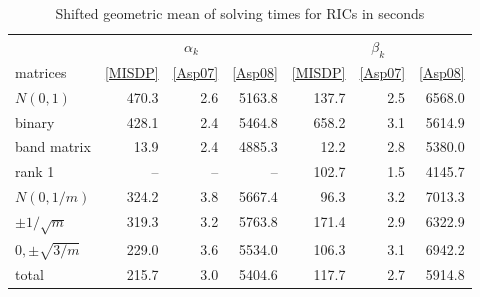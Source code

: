 \begin{table} 
 \begin{scriptsize} \caption{Shifted geometric mean of solving times for RICs in seconds} 
 \label{lhsRhsTime} 
 \begin{tabular*}{\linewidth}{@{}l@{\;\;\extracolsep{\fill}}rrrrrr@{}}\toprule 
  & \multicolumn{3}{c}{$\alpha_k$} & \multicolumn{3}{c}{$\beta_k$} \\ 
\cmidrule(r){2-4} \cmidrule(l){5-7} 
 matrices & \eqref{MISDP} & \eqref{Asp07} & \eqref{Asp08} & \eqref{MISDP} & \eqref{Asp07} & \eqref{Asp08} \\ \midrule 
$N(0,1)$& \num{470.3} & \num{2.6} & \num{5163.8} & \num{137.7} & \num{2.5} & \num{6568.0} \\ 
 binary& \num{428.1} & \num{2.4} & \num{5464.8} & \num{658.2} & \num{3.1} & \num{5614.9} \\ 
 band matrix& \num{13.9} & \num{2.4} & \num{4885.3} & \num{12.2} & \num{2.8} & \num{5380.0} \\ 
 rank 1& -- & -- & -- & \num{102.7} & \num{1.5} & \num{4145.7} \\ 
 $N(0,1/m)$& \num{324.2} & \num{3.8} & \num{5667.4} & \num{96.3} & \num{3.2} & \num{7013.3} \\ 
 $\pm 1/\sqrt{m}$& \num{319.3} & \num{3.2} & \num{5763.8} & \num{171.4} & \num{2.9} & \num{6322.9} \\ 
 $0, \pm \sqrt{3/m}$& \num{229.0} & \num{3.6} & \num{5534.0} & \num{106.3} & \num{3.1} & \num{6942.2} \\ 
 \midrule 
total & \num{215.7} & \num{3.0} & \num{5404.6} & \num{117.7} & \num{2.7} & \num{5914.8} \\ 
 \bottomrule 
 \end{tabular*} 
 \end{scriptsize} 
 \end{table} 